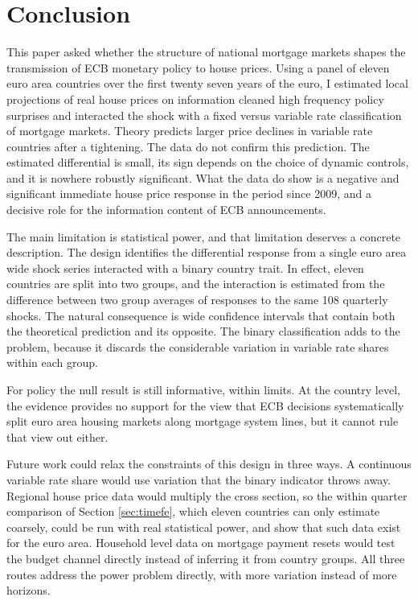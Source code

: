 \section{Conclusion}
\label{sec:conclusion}

This paper asked whether the structure of national mortgage markets shapes
the transmission of ECB monetary policy to house prices. Using a panel of
eleven euro area countries over the first twenty seven years of the euro, I
estimated local projections of real house prices on information cleaned
high frequency policy surprises and interacted the shock with a fixed
versus variable rate classification of mortgage markets. Theory predicts
larger price declines in variable rate countries after a tightening. The
data do not confirm this prediction. The estimated differential is small,
its sign depends on the choice of dynamic controls, and it is nowhere
robustly significant. What the data do show is a negative and significant
immediate house price response in the period since 2009, and a decisive
role for the information content of ECB announcements.

The main limitation is statistical power, and that limitation deserves a
concrete description. The design identifies the differential response from a single
euro area wide shock series interacted with a binary country trait. In
effect, eleven countries are split into two groups, and the interaction is
estimated from the difference between two group averages of responses to
the same 108 quarterly shocks. The natural consequence is wide confidence
intervals that contain both the theoretical prediction and its opposite. The binary classification adds to the
problem, because it discards the considerable variation in variable rate
shares within each group.

For policy the null result is still informative, within limits. At
the country level, the evidence provides no support for the view that ECB
decisions systematically split euro area housing markets along mortgage
system lines, but it cannot rule that view out either.

Future work could relax the constraints of this design in three ways. A
continuous variable rate share would use variation that the binary
indicator throws away. Regional house price data would multiply the cross
section, so the within quarter comparison of Section \ref{sec:timefe},
which eleven countries can only estimate coarsely, could be run with real
statistical power, and \citet{battistini2025} show that such data exist
for the euro area. Household level data on
mortgage payment resets would test the budget channel directly instead of
inferring it from country groups. All three routes address the power
problem directly, with more variation instead of more horizons.
